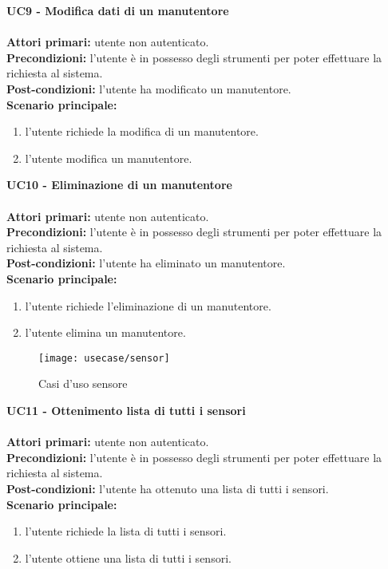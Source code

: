 \leavevmode\newline
\textbf{UC9 - Modifica dati di un manutentore}
\\\\
\textbf{Attori primari:} utente non autenticato.
\\
\textbf{Precondizioni:} l'utente è in possesso degli strumenti per poter effettuare la richiesta al sistema.
\\
\textbf{Post-condizioni:} l'utente ha modificato un manutentore.
\\
\textbf{Scenario principale:}
\begin{enumerate}
    \item l'utente richiede la modifica di un manutentore.
    \item l'utente modifica un manutentore.
\end{enumerate}
\leavevmode\newline
\textbf{UC10 - Eliminazione di un manutentore}
\\\\
\textbf{Attori primari:} utente non autenticato.
\\
\textbf{Precondizioni:} l'utente è in possesso degli strumenti per poter effettuare la richiesta al sistema.
\\
\textbf{Post-condizioni:} l'utente ha eliminato un manutentore.
\\
\textbf{Scenario principale:}
\begin{enumerate}
    \item l'utente richiede l'eliminazione di un manutentore.
    \item l'utente elimina un manutentore.
\end{enumerate}
\clearpage
\leavevmode\newline
\begin{figure}[H]
    \centering
    \texttt{[image: usecase/sensor]}
    \caption{Casi d'uso sensore}
\end{figure}
\textbf{UC11 - Ottenimento lista di tutti i sensori}
\\\\
\textbf{Attori primari:} utente non autenticato.
\\
\textbf{Precondizioni:} l'utente è in possesso degli strumenti per poter effettuare la richiesta al sistema.
\\
\textbf{Post-condizioni:} l'utente ha ottenuto una lista di tutti i sensori.
\\
\textbf{Scenario principale:}
\begin{enumerate}
    \item l'utente richiede la lista di tutti i sensori.
    \item l'utente ottiene una lista di tutti i sensori.
\end{enumerate}

